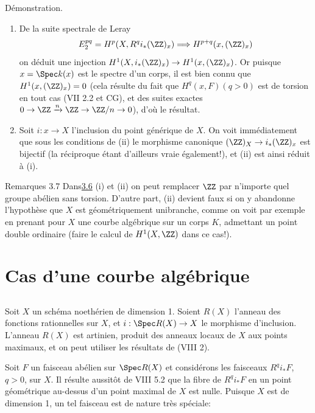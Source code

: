 \documentclass[10pt]{../fichiers-configuration-latex/smfart}
\begin{document}
Démonstration.
\begin{enumerate}
\renewcommand{\theenumi}{\roman{enumi}}
\renewcommand{\labelenumi}{(\theenumi)}
\item De la suite spectrale de Leray
$$
E^{pq}_2=H^p(X,R^{q}i_{\ast}(\ZZ)_x)\Longrightarrow
H^{p+q}(x,(\ZZ)_x)
$$
on déduit une injection
$H^1(X,i_{\ast}(\ZZ)_x)\rightarrow
H^1(x,(\ZZ)_x)$. Or puisque $x=\Spec k(x)$ est le
spectre d'un corps, il est bien connu que
$H^1(x,(\ZZ)_{x})=0$ (cela résulte du fait que
$H^q(x,F)(q>0)$ est de torsion en tout cas (\cf VII 2.2 et CG), et des
suites exactes $0\rightarrow
\ZZ\xrightarrow{n}\ZZ\rightarrow
\ZZ/n\rightarrow 0$), d'où le résultat.

\item Soit $i:x\rightarrow X$ l'inclusion du point générique de
$X$. On voit immédiatement que sous les conditions de (ii) le
morphisme canonique $(\ZZ)_X\rightarrow
i_{\ast}(\ZZ)_x$ est bijectif (la réciproque étant
d'ailleurs vraie également!), et (ii) est ainsi réduit à (i).
\end{enumerate}

\begin{enonce*}[remark]{Remarques 3.7}
Dans\pageoriginale \hyperref[IX.prop3.6]{3.6} (i) et (ii) on peut remplacer
$\ZZ$ par
n'importe quel groupe abélien sans torsion. D'autre part, (ii) devient
faux si on y abandonne l'hypothèse que $X$ est géométriquement
unibranche, comme on voit par exemple en prenant pour $X$ une courbe
algébrique sur un corps $K$, admettant un point double ordinaire
(faire le calcul de $H^1(X,\ZZ)$ dans ce cas!).
\end{enonce*}

\section{Cas d'une courbe algébrique}

\setcounter{subsection}{-1}
\subsection{}
Soit $X$ un schéma noethérien de dimension 1. Soient $R(X)$ l'anneau
des fonctions rationnelles sur $X$, et $i:\Spec R(X)\rightarrow X$ le
morphisme d'inclusion. L'anneau $R(X)$ est artinien, produit des
anneaux locaux de $X$ aux points maximaux, et on peut utiliser les
résultats de (VIII 2).

Soit $F$ un faisceau abélien sur $\Spec R(X)$ et considérons les
faisceaux $R^qi_{\ast}F$, $q>0$, sur $X$. Il résulte aussitôt de VIII
5.2 que la fibre de $R^qi_{\ast}F$ en un point géométrique au-dessus
d'un point maximal de $X$ est nulle. Puisque $X$ est de dimension 1,
un tel faisceau est de nature très spéciale:
\end{document}

